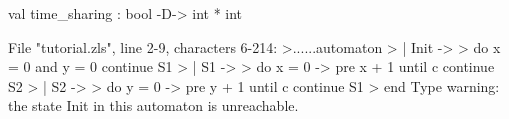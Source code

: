 \chklistingtrue
{}
\begin{ChkListingMsg}
val time_sharing : bool -D-> int * int
\end{ChkListingMsg}
\begin{ChkListingErr}
File "tutorial.zls", line 2-9, characters 6-214:
>......automaton
>      | Init ->
>          do x = 0 and y = 0 continue S1
>      | S1 ->
>          do x = 0 -> pre x + 1 until c continue S2
>      | S2 ->
>          do y = 0 -> pre y + 1 until c continue S1
>      end
Type warning: the state Init in this automaton is unreachable.
\end{ChkListingErr}
